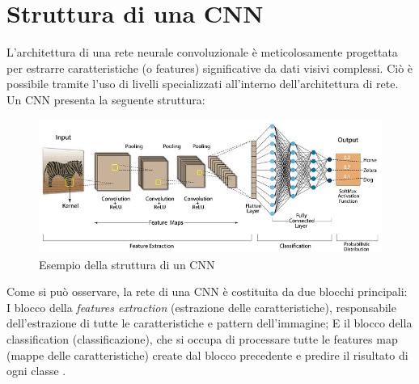 \section{Struttura di una CNN}
L'architettura di una rete neurale convoluzionale è meticolosamente progettata per 
estrarre caratteristiche (o features) significative da dati visivi complessi. 
Ciò è possibile tramite l'uso di livelli specializzati all'interno dell'architettura di rete.
Un CNN presenta la seguente struttura:
\begin{figure}[H]
    \centering
    \includegraphics[width=1\textwidth]{Immagini/Generiche/CNN_struttura2.png}
    \caption{Esempio della struttura di un CNN \cite{ELEMENTI_CNN_1}}
    \label{fig:strutturaCNN}
\end{figure}

Come si può osservare, la rete di una CNN è costituita da due blocchi principali: I blocco 
della \textit{features extraction} (estrazione delle caratteristiche), responsabile dell'estrazione 
di tutte le caratteristiche e pattern dell'immagine; E il blocco della classification (classificazione), 
che si occupa di processare tutte le features map (mappe delle caratteristiche) create dal blocco 
precedente e predire il risultato di ogni classe 
\cite{ELEMENTI_CNN_1, ELEMENTI_CNN_2, ELEMENTI_CNN_3}.


